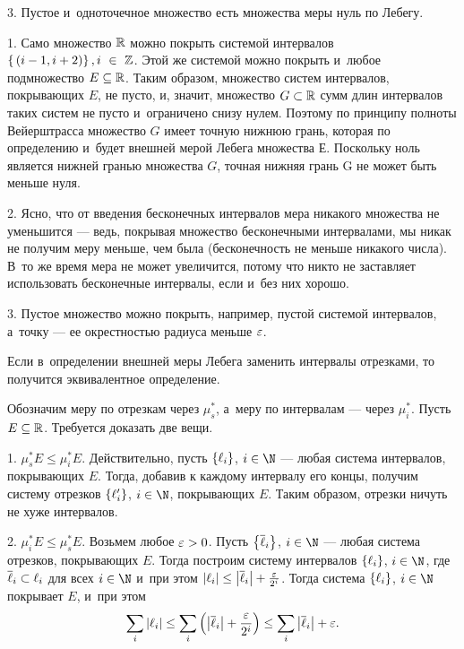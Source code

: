 \documentclass[draft]{article}
\begin{document}
\smallskip

3. Пустое и~одноточечное множество есть множества меры нуль по
Лебегу.

\prs

\smallskip

1. Само множество $\mathbb{R}$ можно покрыть системой интервалов
$\set{\,\at(i-1,i+2)}, i ~ \in ~ \wholes$. Этой же системой
можно покрыть и~любое подмножество $E\subseteq\mathbb{R}$. Таким
образом, множество систем интервалов, покрывающих $E$, не пусто, и,
значит, множество $G \subset \mathbb{R}$ сумм длин интервалов таких
систем не пусто и~ограничено снизу нулем. Поэтому по принципу
полноты Вейерштрасса множество $G$ имеет точную нижнюю грань,
которая по определению и~будет внешней мерой Лебега множества $Е$.
Поскольку ноль является нижней гранью множества $G$, точная нижняя
грань G не может быть меньше нуля.

\smallskip

2. Ясно, что от введения бесконечных интервалов мера никакого
множества не уменьшится --- ведь, покрывая множество бесконечными
интервалами, мы никак не получим меру меньше, чем была
(бесконечность не меньше никакого числа). В~то же время мера не
может увеличится, потому что никто не заставляет использовать
бесконечные интервалы, если и~без них хорошо.

\smallskip

3. Пустое множество можно покрыть, например, пустой системой
интервалов, а~точку --- ее окрестностью радиуса меньше $\varepsilon$.

\pruts

\bigskip

\ut

Если в~определении внешней меры Лебега заменить интервалы отрезками,
то получится эквивалентное определение.

\pr

Обозначим меру по отрезкам через $\mu^*_s$, а~меру по интервалам ---
через $\mu^*_i$. Пусть $E\subseteq\mathbb{R}$. Требуется доказать две
вещи.

\medskip

1. $\mu^*_s E \le \mu^*_i E$. Действительно, пусть $\left\{\ell_{ i}\right\}$,
${\inat}$
--- любая система интервалов, покрывающих $E$. Тогда, добавив к
каждому интервалу его концы, получим систему отрезков $\left\{\ell_{ i}'\right\}$,
${\inat}$, покрывающих $E$. Таким образом, отрезки ничуть не хуже
интервалов.

\medskip

2. $\mu^*_i E \le \mu^*_s E$. Возьмем любое $\varepsilon > 0$. Пусть
$\left\{\overline\ell_{ i}\right\}$, $\inat$ --- любая система отрезков,
покрывающих $E$. Тогда построим систему интервалов $\left\{\ell_{ i}\right\}$,
$\inat$, где $\overline\ell_{ i} \subset \ell_{ i}$ для всех $\inat$ и~при этом
$\left|\ell_{ i}\right|\le\left|\overline\ell_{ i}\right|+{\varepsilon\over2^i}$. Тогда система $\left\{\ell_{ i}\right\}$, $\inat$
покрывает $E$, и~при этом
$$\sumi\abs\li\le\sumi\at(\abs{\si}+{\ep\over2^i})\le
\sumi\abs{\si}+\ep.$$
\end{document}

